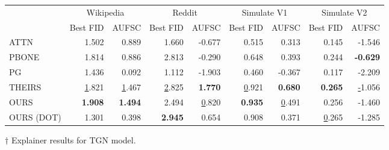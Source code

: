 \begin{tabular}{lrrrrrrrr}
\toprule
 & \multicolumn{2}{c}{Wikipedia} & \multicolumn{2}{c}{Reddit} & \multicolumn{2}{c}{Simulate V1} & \multicolumn{2}{c}{Simulate V2} \\
 & Best FID & AUFSC & Best FID & AUFSC & Best FID & AUFSC & Best FID & AUFSC \\
\midrule
ATTN & 1.502 & 0.889 & 1.660 & -0.677 & 0.515 & 0.313 & 0.145 & -1.546 \\
PBONE & 1.814 & 0.886 & 2.813 & -0.290 & 0.648 & 0.393 & 0.244 & \bfseries -0.629 \\
PG & 1.436 & 0.092 & 1.112 & -1.903 & 0.460 & -0.367 & 0.117 & -2.209 \\
THEIRS & \underline 1.821 & \underline 1.467 & \underline 2.825 & \bfseries 1.770 & \underline 0.921 & \bfseries 0.680 & \bfseries 0.265 & \underline -1.056 \\
OURS & \bfseries 1.908 & \bfseries 1.494 & 2.494 & \underline 0.820 & \bfseries 0.935 & \underline 0.491 & 0.256 & -1.460 \\
OURS (DOT) & 1.301 & 0.398 & \bfseries 2.945 & 0.654 & 0.908 & 0.371 & \underline 0.265 & -1.285 \\
\bottomrule
\end{tabular}
\caption{\label{tab:tgn_results}$\dagger$ Explainer results for TGN model.}
